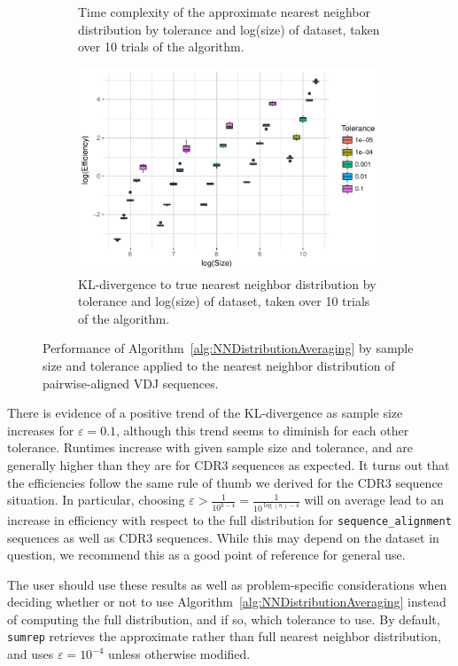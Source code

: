 \documentclass{article}
\begin{document}
\begin{figure}
\begin{subfigure}{0.5\textwidth}
    	\caption{Time complexity of the approximate nearest neighbor distribution by tolerance and log(size) of dataset, taken over 10 trials of the algorithm.}
    	\label{fig:NNTimeBySizeFull}
    \end{subfigure}
    \begin{subfigure}{0.5\textwidth}
        \includegraphics[width=\linewidth]{Figures/NearestNeighbor/Sequence/efficiency_by_size_and_tol.pdf}
    	\caption{KL-divergence to true nearest neighbor distribution by tolerance and log(size) of dataset, taken over 10 trials of the algorithm.}
    	\label{fig:NNEfficiencyBySizeFull}
    \end{subfigure}
     \caption{Performance of Algorithm~\ref{alg:NNDistributionAveraging} by sample size and tolerance applied to the nearest neighbor distribution of pairwise-aligned VDJ sequences.}
\end{figure}
There is evidence of a positive trend of the KL-divergence as sample size increases for $\varepsilon = 0.1$, although this trend seems to diminish for each other tolerance.
Runtimes increase with given sample size and tolerance, and are generally higher than they are for CDR3 sequences as expected.
It turns out that the efficiencies follow the same rule of thumb we derived for the CDR3 sequence situation.
In particular, choosing $\varepsilon > \frac{1}{10^{k - 4}} = \frac{1}{10^{\log(n) - 4}}$ will on average lead to an increase in efficiency with respect to the full distribution for \texttt{sequence\_alignment} sequences as well as CDR3 sequences.
While this may depend on the dataset in question, we recommend this as a good point of reference for general use.

The user should use these results as well as problem-specific considerations when deciding whether or not to use Algorithm~\ref{alg:NNDistributionAveraging} instead of computing the full distribution, and if so, which tolerance to use.
By default, \texttt{sumrep} retrieves the approximate rather than full nearest neighbor distribution, and uses $\varepsilon = 10^{-4}$ unless otherwise modified.
\end{document}
